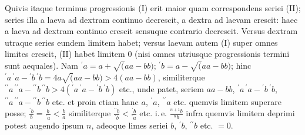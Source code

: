 \par Quivis itaque terminus progressionis (I) erit maior quam correspondens seriei (II); series illa a laeva ad dextram continuo decrescit, a dextra ad laevam
crescit: haec a laeva ad dextram continuo crescit sensuque contrario decrescit.
Versus dextram utraque series eundem limitem habet; versus laevam autem (I)
super omnes limites crescit, (II) habet limitem $0$ (nisi omnes utriusque progressionis termini sunt aequales). Nam ${}^{\prime}\!a=a+\surd(aa-bb)$; ${}^{\prime}\!b=a-\surd(aa-bb)$;
hinc ${}^{\prime}\!a\,{}^{\prime}\!a-{}^{\prime}\!b\,{}^{\prime}\!b=4a\surd(aa-bb)>4(aa-bb)$, similiterque ${}^{\prime\prime}\!a\,\allowbreak {}^{\prime\prime}\!a-{}^{\prime\prime}\!b\,\allowbreak {}^{\prime\prime}\!b>4({}^{\prime}\!a\,\allowbreak {}^{\prime}\!a-{}^{\prime}\!b\,\allowbreak {}^{\prime}\!b)$
etc., unde patet, seriem $aa-bb$, ${}^{\prime}\!a\,{}^{\prime}\!a-{}^{\prime}\!b\,{}^{\prime}\!b$, ${}^{\prime\prime}\!a\,{}^{\prime\prime}\!a-{}^{\prime\prime}\!b\,{}^{\prime\prime}\!b$ etc. et proin etiam hanc
$a$, ${}^{\prime}\!a$, ${}^{\prime\prime}\!a$ etc. quemvis limitem superare posse; $\frac{{}^{\prime}\!b}{b}=\frac{b}{{}^{\prime}\!a}<\frac{b}{a}$ similiterque $\frac{{}^{\prime\prime}\!b}{{}^{\prime}\!b}<\frac{{}^{\prime}\!b}{{}^{\prime}\!a}$ etc.
i.\,e. $\frac{{}^{n+1}\!b}{{}^{n}\!b}$ infra quemvis limitem deprimi potest augendo ipsum $n$, adeoque limes
seriei $b$, ${}^{\prime}\!b$, ${}^{\prime\prime}\!b$ etc. $=0$.
